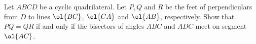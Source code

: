 Let $ABCD$ be a cyclic quadrilateral.
Let $P, Q$ and $R$ be the feet of perpendiculars
from $D$ to lines $\ol{BC}$, $\ol{CA}$ and $\ol{AB}$, respectively.
Show that $PQ = QR$ if and only if the
bisectors of angles $ABC$ and $ADC$ meet on segment $\ol{AC}$.